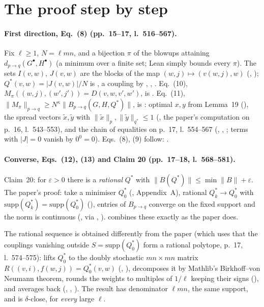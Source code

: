 \section{The proof step by step}

\paragraph{First direction, Eq.~(8) (pp.~15--17, l.~516--567).} Fix $\ell\ge1$, $N=\ell mn$, and a bijection
$\pi$ of the blowups attaining $d_{p\to q}(G^\bullet,H^\bullet)$ (a minimum over a finite set; Lean simply
bounds every $\pi$). The sets $I(v,w)$, $J(v,w)$ are the blocks of the map $(w,j)\mapsto(v(w,j),w)$
(, ); $Q^*(v,w)=|J(v,w)|/N$ is , a coupling by
, , . Eq.~(10),
$M_\pi((w,j),(w',j'))=D(v,w,v',w')$, is . Eq.~(11),
$\|M_\pi\|_{p\to q}\ge N^\kappa\|B_{p\to q}(G,H,Q^*)\|$, is : optimal $x,y$ from Lemma~19
(), the spread vectors $\tilde x,\tilde y$ with
$\|\tilde x\|_p,\|\tilde y\|_{q^*}\le1$ (, the paper's computation on p.~16, l.~543--553), and
the chain of equalities on p.~17, l.~554--567 (, ,
; terms with $|J|=0$ vanish by $0^0=0$). Eqs.~(8), (9) follow:
.

\paragraph{Converse, Eqs.~(12), (13) and Claim 20 (pp.~17--18, l.~568--581).} Claim~20: for $\varepsilon>0$ there is a
\emph{rational} $Q^*$ with $\|B(Q^*)\|\le\min\|B\|+\varepsilon$. The paper's proof: take a minimiser $Q^*_0$
(, Appendix~A), rational $Q^*_k\to Q^*_0$ with $\mathrm{supp}(Q^*_k)=\mathrm{supp}(Q^*_0)$
(), entries of $B_{p\to q}$ converge on the fixed support and the norm is
continuous (, via , ).
 combines these exactly as the paper does.

The rational sequence is obtained differently from the paper (which uses that the couplings vanishing outside
$S=\mathrm{supp}(Q^*_0)$ form a rational polytope, p.~17, l.~574--575):
 lifts $Q^*_0$ to the doubly stochastic $mn\times mn$ matrix
$R((v,i),f(w,j))=Q^*_0(v,w)$ (, ), decomposes it by Mathlib's
Birkhoff--von Neumann theorem, rounds the weights to multiples of $1/\ell$ keeping their signs
(), and averages back (, , ). The
result has denominator $\ell mn$, the same support, and is $\delta$-close, for \emph{every} large $\ell$.

